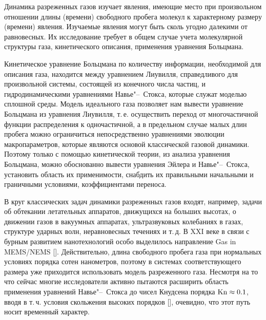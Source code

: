 Динамика разреженных газов изучает явления, имеющие место при произвольном
отношении длины (времени) свободного пробега молекул к характерному размеру (времени) явления.
Изучаемые явления могут быть сколь угодно далекими от равновесных.
Их исследование требует в общем случае учета молекулярной структуры газа,
кинетического описания, применения уравнения Больцмана.

Кинетическое уравнение Больцмана по количеству информации, необходимой для описания газа,
находится между уравнением Лиувилля, справедливого для произвольной системы, состоящей из конечного числа частиц,
и гидродинамическими уравнениями Навье"--~Стокса, которые служат моделью сплошной среды.
Модель идеального газа позволяет нам вывести уравнение Больцмана из уравнения Лиувилля,
т.\,е. осуществить переход от многочастичной функции распределения к одночастичной,
а в предельном случае малых длин пробега можно ограничиться непосредственно уравнениями эволюции макропараметров,
которые являются основой классической газовой динамики.
Поэтому только с помощью кинетической теории, из анализа уравнения Больцмана, можно обоснованно
вывести уравнения Эйлера и Навье"--~Стокса, установить область их применимости,
снабдить их правильными начальными и граничными условиями, коэффициентами переноса.

В круг классических задач динамики разреженных газов входят, например,
задачи об обтекании летательных аппаратов, движущихся на больших высотах, о движении газов в вакуумных аппаратах,
ультразвуковых колебаниях в газах, структуре ударных волн, неравновесных течениях и т.\,д.
В XXI веке в связи с бурным развитием нанотехнологий особо выделилось направление Gas in MEMS/NEMS [].
Действительно, длина свободного пробега газа при нормальных условиях порядка сотен нанометров,
поэтому в системах соответствующего размера уже приходится использовать модель разреженного газа.
Несмотря на то что сейчас многие исследователи активно пытаются расширить область применения 
уравнений Навье"--~Стокса до чисел Кнудсена порядка \(\mathrm{Kn}\approx0.1\), вводя в т.\,ч. условия скольжения высоких порядков [],
очевидно, что этот путь носит временный характер.


